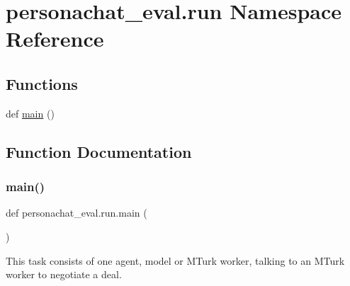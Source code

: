 \hypertarget{namespacepersonachat__eval_1_1run}{}\section{personachat\+\_\+eval.\+run Namespace Reference}
\label{namespacepersonachat__eval_1_1run}
\subsection*{Functions}
\begin{DoxyCompactItemize}
\item 
def \hyperlink{namespacepersonachat__eval_1_1run_a712c8823f07511abe11dce3e1e40f142}{main} ()
\end{DoxyCompactItemize}


\subsection{Function Documentation}
\mbox{\label{namespacepersonachat__eval_1_1run_a712c8823f07511abe11dce3e1e40f142}} 
\subsubsection{\texorpdfstring{main()}{main()}}
{\footnotesize\ttfamily def personachat\+\_\+eval.\+run.\+main (\begin{DoxyParamCaption}{ }\end{DoxyParamCaption})}

\begin{DoxyVerb}This task consists of one agent, model or MTurk worker, talking to an MTurk worker
to negotiate a deal.
\end{DoxyVerb}
 